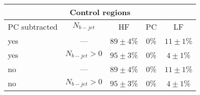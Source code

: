     \begin{tabular}{|lc|ccc|}
    \hline
    \multicolumn{5}{|c|}{\bf{Control regions}}   \\ \hline \hline
    PC subtracted &$N_{b-jet}$  &{HF} &{PC} &{LF} \\ \hline
    yes &--- &$89\pm 4$\% &$0$\% &$11\pm 1$\% \\
    yes &$N_{b-jet}>0$  &$95\pm 3$\% &$0$\% &$4\pm 1$\%\\ \hline
    no &--- &$89\pm 4$\% &$0$\% &$11\pm 1$\% \\
    no &$N_{b-jet}>0$  &$95\pm 3$\% &$0$\% &$4\pm 1$\%\\ 
    \hline
  \end{tabular}
  
